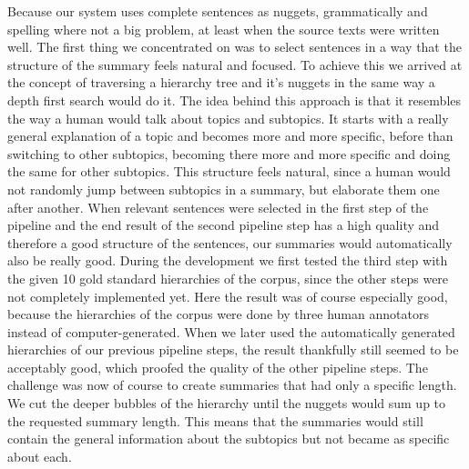 Because our system uses complete sentences as nuggets, grammatically and spelling
where not a big problem, at least when the source texts were written well. The
first thing we concentrated on was to select sentences in a way that the structure
of the summary feels natural and focused. To achieve this we arrived at the
concept of traversing a hierarchy tree and it's nuggets in the same way a depth
first search would do it. The idea behind this approach is that it resembles the
way a human would talk about topics and subtopics. It starts with a really general
explanation of a topic and becomes more and more specific, before than switching
to other subtopics, becoming there more and more specific and doing the same for
other subtopics. This structure feels natural, since a human would not randomly
jump between subtopics in a summary, but elaborate them one after another.
When relevant sentences were selected in the first step of the
pipeline and the end result of the second pipeline step has a high quality
and therefore a good structure of the sentences, our summaries would automatically
also be really good. During the development we first tested the third step with
the given 10 gold standard hierarchies of the corpus, since the other steps were
not completely implemented yet. Here the result was of course especially good,
because the hierarchies of the corpus were done by three human annotators
instead of computer-generated. When we later used the automatically generated
hierarchies of our previous pipeline steps, the result thankfully still seemed
to be acceptably good, which proofed the quality of the other pipeline steps.
The challenge was now of course to create summaries that
had only a specific length. We cut the deeper bubbles of the hierarchy until the
nuggets would sum up to the requested summary length. This means that the summaries
would still contain the general information about the subtopics but not became
as specific about each.

